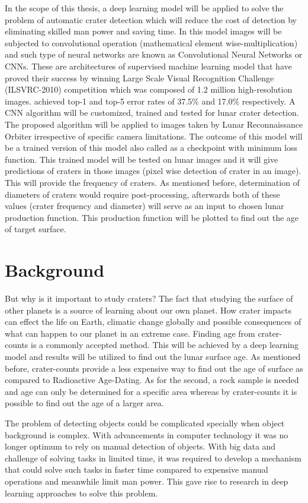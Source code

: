 \documentclass[11pt]{article}
\begin{document}
In the scope of this thesis, a deep learning model will be applied to solve the problem of automatic crater detection which will reduce the cost of detection by eliminating skilled man power and saving time. In this model images will be subjected to convolutional operation (mathematical element wise-multiplication) and such type of neural networks are known as Convolutional Neural Networks or CNNs. These are architectures of supervised machine learning model that have proved their success by winning Large Scale Visual Recognition Challenge (ILSVRC-2010) competition which was composed of 1.2 million high-resolution images. \cite{krizhevsky_imagenet_2012} achieved top-1 and top-5 error rates of 37.5\% and 17.0\% respectively. A CNN algorithm will be customized, trained and tested for lunar crater detection. The proposed algorithm will be applied to images taken by Lunar Reconnaissance Orbiter irrespective of specific camera limitations. The outcome of this model will be a trained version of this model also called as a checkpoint with minimum loss function. This trained model will be tested on lunar images and it will give predictions of craters in those images (pixel wise detection of crater in an image). This will provide the frequency of craters. As mentioned before, determination of diameters of craters would require post-processing, afterwards both of these values (crater frequency and diameter) will serve as an input to chosen lunar production function. This production function will be plotted to find out the age of target surface.

\section{Background}
But why is it important to study craters? The fact that studying the surface of other planets is a source of learning about our own planet. How crater impacts can effect the life on Earth, climatic change globally and possible consequences of what can happen to our planet in an extreme case. Finding age from crater-counts is a commonly accepted method. This will be achieved by a deep learning model and results will be utilized to find out the lunar surface age. As mentioned before, crater-counts provide a less expensive way to find out the age of surface as compared to Radioactive Age-Dating. As for the second, a rock sample is needed and age can only be determined for a specific area whereas by crater-counts it is possible to find out the age of a larger area.

The problem of detecting objects could be complicated specially when object background is complex. With advancements in computer technology it was no longer optimum to rely on manual detection of objects. With big data and challenge of solving tasks in limited time, it was required to develop a mechanism that could solve such tasks in faster time compared to expensive manual operations and meanwhile limit man power. This gave rise to research in deep learning approaches to solve this problem.
\end{document}
